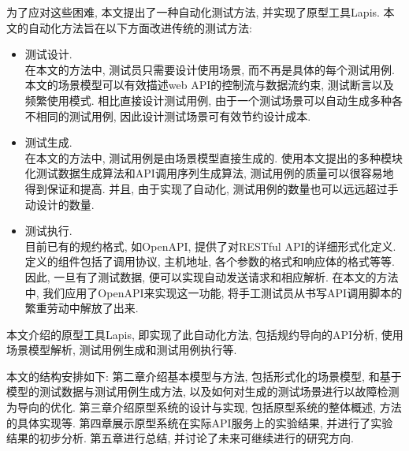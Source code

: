         为了应对这些困难, 本文提出了一种自动化测试方法, 并实现了原型工具Lapis. 本文的自动化方法旨在以下方面改进传统的测试方法:
        \begin{itemize}
            \item 测试设计. \\
                在本文的方法中, 测试员只需要设计使用场景, 而不再是具体的每个测试用例. 本文的场景模型可以有效描述web API的控制流与数据流约束, 测试断言以及频繁使用模式. 相比直接设计测试用例, 由于一个测试场景可以自动生成多种各不相同的测试用例, 因此设计测试场景可有效节约设计成本.
            
            \item 测试生成.\\
                在本文的方法中, 测试用例是由场景模型直接生成的. 使用本文提出的多种模块化测试数据生成算法和API调用序列生成算法, 测试用例的质量可以很容易地得到保证和提高. 并且, 由于实现了自动化, 测试用例的数量也可以远远超过手动设计的数量.
            
            \item 测试执行.\\
                目前已有的规约格式, 如OpenAPI, 提供了对RESTful API的详细形式化定义. 定义的组件包括了调用协议, 主机地址, 各个参数的格式和响应体的格式等等. 因此, 一旦有了测试数据, 便可以实现自动发送请求和相应解析. 在本文的方法中, 我们应用了OpenAPI来实现这一功能, 将手工测试员从书写API调用脚本的繁重劳动中解放了出来.
        \end{itemize}
        本文介绍的原型工具Lapis, 即实现了此自动化方法, 包括规约导向的API分析, 使用场景模型解析, 测试用例生成和测试用例执行等.
        
        本文的结构安排如下: 第二章介绍基本模型与方法, 包括形式化的场景模型, 和基于模型的测试数据与测试用例生成方法, 以及如何对生成的测试场景进行以故障检测为导向的优化. 第三章介绍原型系统的设计与实现, 包括原型系统的整体概述, 方法的具体实现等. 第四章展示原型系统在实际API服务上的实验结果, 并进行了实验结果的初步分析. 第五章进行总结, 并讨论了未来可继续进行的研究方向.
        

